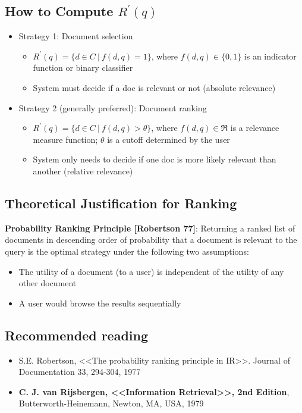\subsection{How to Compute $R^\prime(q)$}
\begin{itemize}
\item Strategy 1: Document selection
    \begin{itemize}
    \item $R^\prime(q)=\{d \in C \:\big|\: f(d,q)=1\}$, where $f(d,q) \in \{0,1\}$ is an indicator function or binary classifier
    \item System must decide if a doc is relevant or not (absolute relevance)
    \end{itemize}
\item Strategy 2 (generally preferred): Document ranking
    \begin{itemize}
    \item $R^\prime(q)=\{d \in C \:\big|\: f(d,q)>\theta\}$, where $f(d,q) \in \Re$ is a relevance measure function; $\theta$ is a cutoff determined by the user
    \item System only needs to decide if one doc is more likely relevant than another (relative relevance)
    \end{itemize}
\end{itemize}


\subsection{Theoretical Justification for Ranking}
\textbf{Probability Ranking Principle [Robertson 77]}: Returning a ranked list of documents in descending order of probability that a document is relevant to the query is the optimal strategy under the following two assumptions:
\begin{itemize}
\item The utility of a document (to a user) is independent of the utility of any other document
\item A user would browse the results sequentially
\end{itemize}


\subsection{Recommended reading}
\begin{itemize}
\item S.E. Robertson, <<The probability ranking principle in IR>>. Journal of Documentation 33, 294-304, 1977
\item \textbf{C. J. van Rijsbergen, <<Information Retrieval>>, 2nd Edition}, Butterworth-Heinemann, Newton, MA, USA, 1979
\end{itemize}


